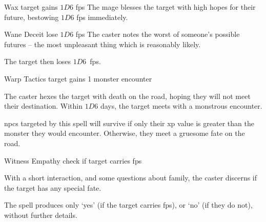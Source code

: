   {\mFate}%
  {Wax}%
  {}%
  {\tn}%
  {target gains $1D6$ \glspl{fp}}%
  {
    The mage blesses the target with high hopes for their future, bestowing $1D6$ \glspl{fp} immediately.
  }

  {\mFate}%
  {Wane}%
  {}%
  {Deceit}%
  {lose $1D6$ \glspl{fp}}%
  {
    The caster notes the worst of someone's possible futures -- the most unpleasant thing which is reasonably likely.
  }

The target then loses $1D6$~\glspl{fp}.

  {\mFate}%
  {Warp}%
  {}%
  {Tactics}%
  {target gains 1 monster encounter}%
  {
    The caster hexes the target with death on the road, hoping they will not meet their destination.
    Within $1D6$ days, the target meets with a monstrous encounter.%

    \Glspl{npc} targeted by this spell will survive if only their \gls{xp} value is greater than the monster they would encounter.
    Otherwise, they meet a gruesome fate on the road.
  }

  {\mFate}%
  {Witness}%
  {}%
  {Empathy}%
  {check if target carries \glspl{fp}}%
  {
    With a short interaction, and some questions about family, the caster discerns if the target has any special fate.

    The spell produces only `yes' (if the target carries \glspl{fp}), or `no' (if they do not), without further details.
  }

